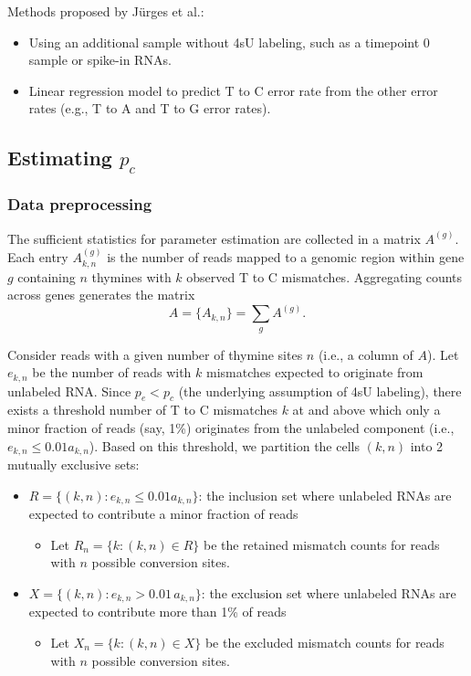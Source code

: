 \documentclass[11pt]{article}
\begin{document}
Methods proposed by Jürges et al.:
\begin{itemize}
    \item Using an additional sample without 4sU labeling, such as a timepoint 0 sample or spike-in RNAs.
    \item Linear regression model to predict T to C error rate from the other error rates (e.g., T to A and T to G error rates).
\end{itemize}

\subsection{\texorpdfstring{Estimating $p_c$}{Estimating pc}}

\subsubsection{Data preprocessing}

The sufficient statistics for parameter estimation are collected in a matrix $A^{(g)}$. Each entry $A_{k,n}^{(g)}$ is the number of reads mapped to a genomic region within gene $g$ containing $n$ thymines with $k$ observed T to C mismatches. Aggregating counts across genes generates the matrix
\[
A=\{A_{k,n}\}=\sum_g A^{(g)}.
\]

Consider reads with a given number of thymine sites $n$ (i.e., a column of $A$). Let $e_{k,n}$ be the number of reads with $k$ mismatches expected to originate from unlabeled RNA. Since $p_e < p_c$ (the underlying assumption of 4sU labeling), there exists a threshold number of T to C mismatches $k$ at and above which only a minor fraction of reads (say, 1\%) originates from the unlabeled component (i.e., $e_{k,n} \leq 0.01 a_{k,n}$). Based on this threshold, we partition the cells $(k, n)$ into 2 mutually exclusive sets:
\begin{itemize}
    \item $R=\{(k,n): e_{k,n} \leq 0.01 a_{k,n}\}$: the inclusion set where unlabeled RNAs are expected to contribute a minor fraction of reads
    \begin{itemize}
        \item Let $R_n=\{k:(k,n)\in R\}$ be the retained mismatch counts for reads with $n$ possible conversion sites.
    \end{itemize}
    \item $X=\{(k,n): e_{k,n}>0.01\,a_{k,n}\}$: the exclusion set where unlabeled RNAs are expected to contribute more than 1\% of reads
    \begin{itemize}
        \item Let $X_n=\{k:(k,n)\in X\}$ be the excluded mismatch counts for reads with $n$ possible conversion sites.
    \end{itemize}
\end{itemize}
\end{document}
